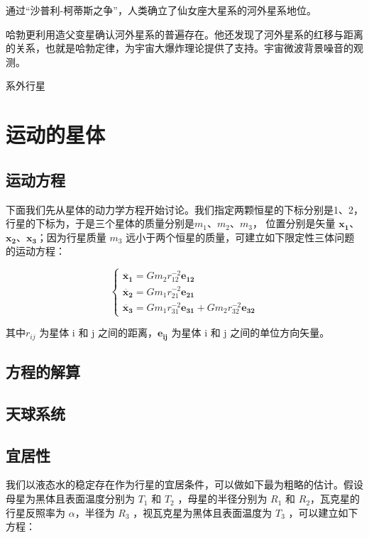 \documentclass[a4paper,10.5pt]{article}
\begin{document}
通过“沙普利-柯蒂斯之争”，人类确立了仙女座大星系的河外星系地位。

哈勃更利用造父变星确认河外星系的普遍存在。他还发现了河外星系的红移与距离的关系，也就是哈勃定律，为宇宙大爆炸理论提供了支持。宇宙微波背景噪音的观测。

系外行星

\newpage

\section{运动的星体}

\subsection{运动方程}

下面我们先从星体的动力学方程开始讨论。我们指定两颗恒星的下标分别是1、2，行星的下标为，于是三个星体的质量分别是$m_1$、$m_2$、$m_3$，
位置分别是矢量 $\mathbf{x_1}$、$\mathbf{x_2}$、$\mathbf{x_3}$；因为行星质量 $m_3$ 远小于两个恒星的质量，可建立如下限定性三体问题的运动方程：

$$
\begin{cases}
\ddot{\mathbf{x_1}} = Gm_2r_{12}^{-2} \mathbf{e_{12}}\\
\ddot{\mathbf{x_2}} = Gm_1r_{21}^{-2} \mathbf{e_{21}}\\
\ddot{\mathbf{x_3}} = Gm_1r_{31}^{-2} \mathbf{e_{31}} + Gm_2r_{32}^{-2} \mathbf{e_{32}}
\end{cases}
$$

其中$r_{ij}$ 为星体 i 和 j 之间的距离，$\mathbf{e_{ij}}$ 为星体 i 和 j 之间的单位方向矢量。

\subsection{方程的解算}

\subsection{天球系统}

\subsection{宜居性}

我们以液态水的稳定存在作为行星的宜居条件，可以做如下最为粗略的估计。假设母星为黑体且表面温度分别为 $T_1$ 和 $T_2$ ，母星的半径分别为 $R_1$ 和 $R_2$，瓦克星的行星反照率为 $\alpha$，半径为 $R_3$ ，视瓦克星为黑体且表面温度为 $T_3$  ，可以建立如下方程：
\end{document}
